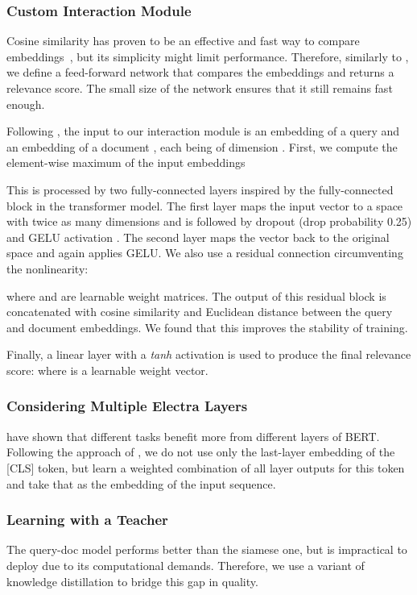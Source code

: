 \documentclass[letterpaper]{article} \usepackage{aaai22 }  \usepackage{times}  \usepackage{helvet}  \usepackage{courier}  \usepackage[hyphens]{url}  \usepackage{graphicx} \usepackage{amsmath,amsfonts,amssymb, mathabx,bm,bbm}
\begin{document}
\subsubsection{Custom Interaction Module}
\label{ssec:custom_metric}

Cosine similarity has proven to be an effective and fast way to compare embeddings~\cite{sentence_bert}, but its simplicity might limit performance. Therefore, similarly to \citet{karpukhin2020dense}, we define a feed-forward network that compares the embeddings and returns a relevance score. The small size of the network ensures that it still remains fast enough.

Following \citet{twinbert}, the input to our interaction module is an embedding  of a query  and an embedding  of a document , each being of dimension . First, we compute the element-wise maximum of the input embeddings 

This is processed by two fully-connected layers inspired by the fully-connected block in the transformer model. The first layer maps the input vector to a space with twice as many dimensions and is followed by dropout (drop probability 0.25) and GELU activation \cite{gelu2016}. The second layer maps the vector back to the original space and again applies GELU. We also use a residual connection circumventing the nonlinearity:

where  and  are learnable weight matrices.
The output  of this residual block is concatenated with cosine similarity and Euclidean distance between the query and document embeddings. We found that this improves the stability of training.


Finally, a linear layer with a \emph{tanh} activation is used to produce the final relevance score: 
where  is a learnable weight vector.


\subsubsection{Considering Multiple Electra Layers}

\citet{tenney-etal-2019-bert} have shown that different tasks benefit more from different layers of BERT. Following the approach of \citet{kondratyuk201975}, we do not use only the last-layer embedding of the [CLS] token, but learn a weighted combination of all layer outputs for this token and take that as the embedding of the input sequence.

\subsubsection{Learning with a Teacher}
The query-doc model performs better than the siamese one, but is impractical to deploy due to its computational demands. Therefore, we use a variant of knowledge distillation to bridge this gap in quality.
\end{document}
